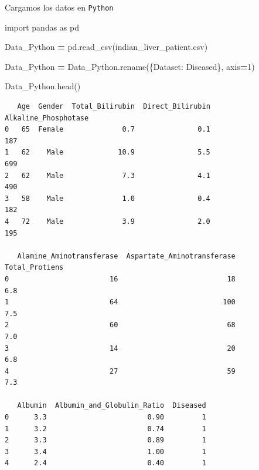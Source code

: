 \documentclass[
  11pt,
  a4paper,
]{article}
\newenvironment{Shaded}{\begin{snugshade}}{\end{snugshade}}
\newcommand{\DecValTok}[1]{\textcolor[rgb]{0.00,0.00,0.81}{#1}}
\newcommand{\ImportTok}[1]{#1}
\newcommand{\NormalTok}[1]{#1}
\newcommand{\OperatorTok}[1]{\textcolor[rgb]{0.81,0.36,0.00}{\textbf{#1}}}
\newcommand{\StringTok}[1]{\textcolor[rgb]{0.31,0.60,0.02}{#1}}
\begin{document}
\newpage

Cargamos los datos en \texttt{Python}

\begin{Shaded}
\begin{Highlighting}[]
\ImportTok{import}\NormalTok{ pandas }\ImportTok{as}\NormalTok{ pd}
\end{Highlighting}
\end{Shaded}

\begin{Shaded}
\begin{Highlighting}[]
\NormalTok{Data\_Python }\OperatorTok{=}\NormalTok{ pd.read\_csv(}\StringTok{\textquotesingle{}indian\_liver\_patient.csv\textquotesingle{}}\NormalTok{)}
\end{Highlighting}
\end{Shaded}

\begin{Shaded}
\begin{Highlighting}[]
\NormalTok{Data\_Python }\OperatorTok{=}\NormalTok{ Data\_Python.rename(\{}\StringTok{\textquotesingle{}Dataset\textquotesingle{}}\NormalTok{: }\StringTok{\textquotesingle{}Diseased\textquotesingle{}}\NormalTok{\}, axis}\OperatorTok{=}\DecValTok{1}\NormalTok{)}
\end{Highlighting}
\end{Shaded}

\begin{Shaded}
\begin{Highlighting}[]
\NormalTok{Data\_Python.head()}
\end{Highlighting}
\end{Shaded}

\begin{verbatim}
   Age  Gender  Total_Bilirubin  Direct_Bilirubin  Alkaline_Phosphotase  
0   65  Female              0.7               0.1                   187   
1   62    Male             10.9               5.5                   699   
2   62    Male              7.3               4.1                   490   
3   58    Male              1.0               0.4                   182   
4   72    Male              3.9               2.0                   195   

   Alamine_Aminotransferase  Aspartate_Aminotransferase  Total_Protiens  
0                        16                          18             6.8   
1                        64                         100             7.5   
2                        60                          68             7.0   
3                        14                          20             6.8   
4                        27                          59             7.3   

   Albumin  Albumin_and_Globulin_Ratio  Diseased  
0      3.3                        0.90         1  
1      3.2                        0.74         1  
2      3.3                        0.89         1  
3      3.4                        1.00         1  
4      2.4                        0.40         1 
\end{verbatim}
\end{document}
